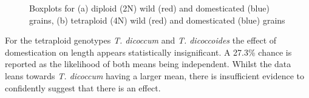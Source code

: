 \documentclass[11pt]{report}
\begin{document}
\begin{figure}[!ht]
  \hfill
  \caption{Boxplots for (a) diploid (2N) wild (red) and domesticated (blue) grains, (b) tetraploid (4N) wild (red) and domesticated (blue) grains}
  \label{fig:lendemest}
\end{figure}

For the tetraploid genotypes \emph{T. dicoccum} and \emph{T. dicoccoides} the effect of domestication on length appears statistically insignificant. A 27.3\% chance is reported as the likelihood of both means being independent. Whilst the data leans towards \emph{T. dicoccum} having a larger mean, there is insufficient evidence to confidently suggest that there is an effect.
\end{document}
